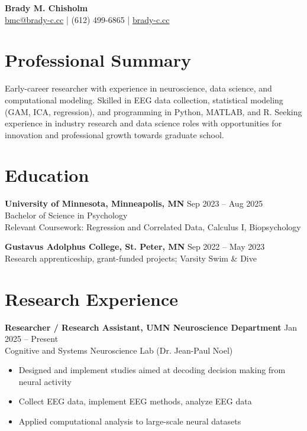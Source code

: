 \documentclass[11pt]{article}
\begin{document}
\begin{center}
    {\LARGE \textbf{Brady M. Chisholm}} \\
    \href{mailto:bmc@brady-c.cc}{bmc@brady-c.cc} \quad | \quad (612) 499-6865 \quad | \quad \href{http://brady-c.cc}{brady-c.cc} \\
\end{center}

\section*{Professional Summary}
Early-career researcher with experience in neuroscience, 
data science, and computational modeling. Skilled in EEG data collection, 
statistical modeling (GAM, ICA, regression), and programming in Python,
 MATLAB, and R. Seeking experience in industry research and data science roles with opportunities for innovation and professional growth towards graduate school.  

\section*{Education}
\textbf{University of Minnesota, Minneapolis, MN} \hfill Sep 2023 -- Aug 2025 \\
Bachelor of Science in Psychology \\
Relevant Coursework: Regression and Correlated Data, Calculus I, Biopsychology  

\textbf{Gustavus Adolphus College, St. Peter, MN} \hfill Sep 2022 -- May 2023 \\
Research apprenticeship, grant-funded projects; Varsity Swim \& Dive  

\section*{Research Experience}
\textbf{Researcher / Research Assistant, UMN Neuroscience Department} \hfill Jan 2025 -- Present \\
Cognitive and Systems Neuroscience Lab (Dr. Jean-Paul Noel) 
\begin{itemize}  
  \item Designed and implement studies aimed at decoding decision making from neural activity 
  \item Collect EEG data, implement EEG methods, analyze EEG data 
  \item Applied computational analysis to large-scale neural datasets  
\end{itemize}
\end{document}
